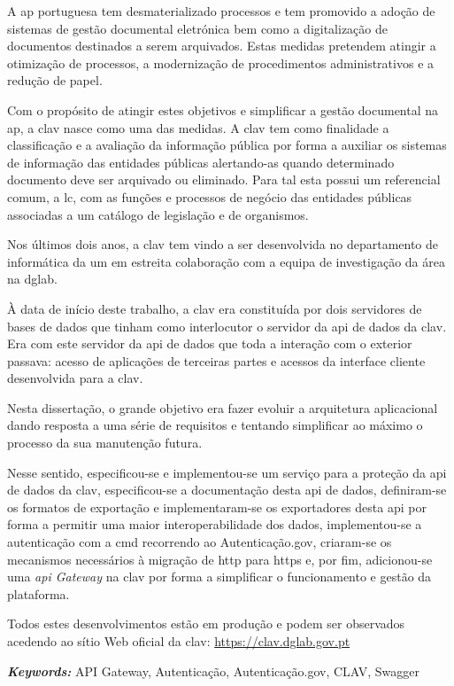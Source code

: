 A \acrlong{ap} portuguesa tem desmaterializado processos e tem promovido a adoção de sistemas de gestão documental eletrónica bem como a digitalização de documentos destinados a serem arquivados. Estas medidas pretendem atingir a otimização de processos, a modernização de procedimentos administrativos e a redução de papel.

Com o propósito de atingir estes objetivos e simplificar a gestão documental na \acrlong{ap}, a \acrfull{clav} nasce como uma das medidas. A \acrshort{clav} tem como finalidade a classificação e a avaliação da informação pública por forma a auxiliar os sistemas de informação das entidades públicas alertando-as quando determinado documento deve ser arquivado ou eliminado. Para tal esta possui um referencial comum, a \acrlong{lc}, com as funções e processos de negócio das entidades públicas associadas a um catálogo de legislação e de organismos.

Nos últimos dois anos, a \acrshort{clav} tem vindo a ser desenvolvida no departamento de informática da \acrlong{um} em estreita colaboração com a equipa de investigação da área na \acrlong{dglab}.

À data de início deste trabalho, a \acrshort{clav} era constituída por dois servidores de bases de dados que tinham como interlocutor o servidor da \acrshort{api} de dados da \acrshort{clav}. Era com este servidor da \acrshort{api} de dados que toda a interação com o exterior passava: acesso de aplicações de terceiras partes e acessos da interface cliente desenvolvida para a \acrshort{clav}.

Nesta dissertação, o grande objetivo era fazer evoluir a arquitetura aplicacional dando resposta a uma série de requisitos e tentando simplificar ao máximo o processo da sua manutenção futura. 

Nesse sentido, especificou-se e implementou-se um serviço para a proteção da \acrshort{api} de dados da \acrshort{clav},  especificou-se a documentação desta \acrshort{api} de dados, definiram-se os formatos de exportação e implementaram-se os exportadores desta \acrshort{api} por forma a permitir uma maior interoperabilidade dos dados, implementou-se a autenticação com a \acrlong{cmd} recorrendo ao Autenticação.gov, 
criaram-se os mecanismos necessários à migração de \acrshort{http} para \acrshort{https} e, por fim, adicionou-se uma \textit{\acrshort{api} Gateway} na \acrshort{clav} por forma a simplificar o funcionamento e gestão da plataforma.

Todos estes desenvolvimentos estão em produção e podem ser observados acedendo ao sítio Web oficial da \acrshort{clav}: \url{https://clav.dglab.gov.pt}

\vspace{1cm}

\textit{\textbf{Keywords:}} API Gateway, Autenticação, Autenticação.gov, CLAV, Swagger  
